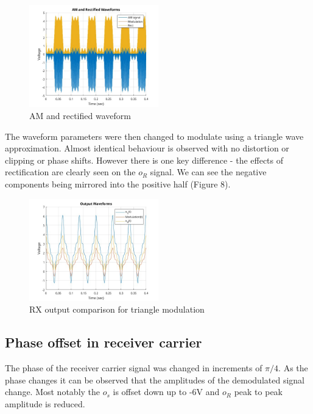 \documentclass[a4paper]{article}
\begin{document}
        \begin{figure}[htbp]
        \centering

        \includegraphics[width=0.5\textwidth]{Images/AM_RX_1/Square Wave/AM and Rectified Waveforms.jpg}
        \caption{AM and rectified waveform}

        \end{figure}

        \newpage

        The waveform parameters were then changed to modulate using a triangle wave approximation. Almost identical behaviour is observed with no distortion or clipping or phase shifts. However there is one key difference - the effects of rectification are clearly seen on the $o_R$ signal. We can see the negative components being mirrored into the positive half (Figure 8).

        \begin{figure}[htbp]
        \centering

        \includegraphics[width=0.5\textwidth]{Images/AM_RX_1/Triangular Wave/Output Waveforms.jpg}
        \caption{RX output comparison for triangle modulation}

        \end{figure}

        \newpage



        \subsection*{Phase offset in receiver carrier}
        The phase of the receiver carrier signal was changed in increments of $\pi/4$. As the phase changes it can be observed that the amplitudes of the demodulated signal change. Most notably the $o_s$ is offset down up to -6V and $o_R$ peak to peak amplitude is reduced.
\end{document}
